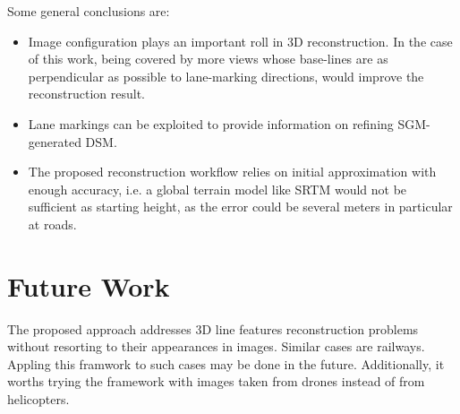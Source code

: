 \clearpage
Some general conclusions are:
\begin{itemize}
	\item Image configuration plays an important roll in 3D reconstruction. In the case of this work, being covered by more views whose base-lines are as perpendicular as possible to lane-marking directions, would improve the reconstruction result.
	
	\item Lane markings can be exploited to provide information on refining SGM-generated DSM.%

	\item The proposed reconstruction workflow relies on initial approximation with enough accuracy, i.e. a global terrain model like SRTM would not be sufficient as starting height, as the error could be several meters in particular at roads.
\end{itemize}





\section*{Future Work}
\label{chap:futurework}



The proposed approach addresses 3D line features reconstruction problems without resorting to their appearances in images. Similar cases are railways. Appling this framwork to such cases may be done in the future. Additionally, it worths trying the framework with images taken from drones instead of from helicopters.

